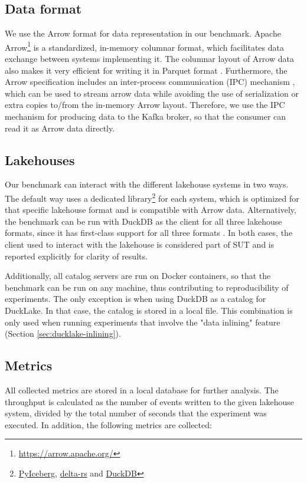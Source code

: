 \subsection{Data format}
We use the Arrow format for data representation in our benchmark. Apache Arrow\footnote{\url{https://arrow.apache.org/}} is a standardized, in-memory columnar format, which facilitates data exchange between systems implementing it. The columnar layout of Arrow data also makes it very efficient for writing it in Parquet format \cite{ApacheArrowFrequently}. Furthermore, the Arrow specification includes an inter-process communication (IPC) mechanism \cite{ApacheArrowStreaming}, which can be used to stream arrow data while avoiding the use of serialization or extra copies to/from the in-memory Arrow layout. Therefore, we use the IPC mechanism for producing data to the Kafka broker, so that the consumer can read it as Arrow data directly.

\subsection{Lakehouses}
Our benchmark can interact with the different lakehouse systems in two ways. The default way uses a dedicated library\footnote{\href{https://py.iceberg.apache.org/}{PyIceberg}, \href{https://delta-io.github.io/delta-rs/}{delta-rs} and \href{https://duckdb.org/}{DuckDB}} for each system, which is optimized for that specific lakehouse format and is compatible with Arrow data. Alternatively, the benchmark can be run with DuckDB as the client for all three lakehouse formats, since it has first-class support for all three formats \cite{DuckDBDocumentationLakehouse2025}. In both cases, the client used to interact with the lakehouse is considered part of SUT and is reported explicitly for clarity of results.

Additionally, all catalog servers are run on Docker containers, so that the benchmark can be run on any machine, thus contributing to reproducibility of experiments. The only exception is when using DuckDB as a catalog for DuckLake. In that case, the catalog is stored in a local file. This combination is only used when running experiments that involve the "data inlining" feature (Section \ref{sec:ducklake-inlining}).

\subsection{Metrics}
All collected metrics are stored in a local database for further analysis. The throughput is calculated as the number of events written to the given lakehouse system, divided by the total number of seconds that the experiment was executed. In addition, the following metrics are collected:

